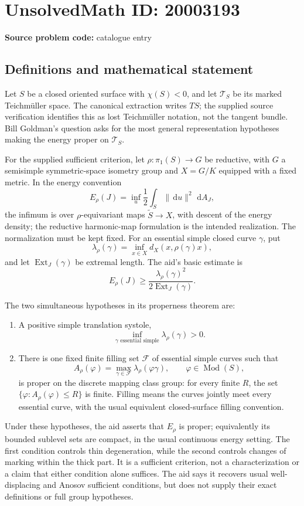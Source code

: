\documentclass[11pt]{article}
\newcommand{\dd}{\,\mathrm{d}}
\begin{document}
\section*{UnsolvedMath ID: 20003193}
\textbf{Source problem code:} catalogue entry
\subsection{Definitions and mathematical statement}
Let \(S\) be a closed oriented surface with \(\chi(S)<0\), and let \(\mathcal T_S\) be its marked Teichm\"uller space. The canonical extraction writes \(TS\); the supplied source verification identifies this as lost Teichm\"uller notation, not the tangent bundle. Bill Goldman's question asks for the most general representation hypotheses making the energy proper on \(\mathcal T_S\).

For the supplied sufficient criterion, let \(\rho:\pi_1(S)\to G\) be reductive, with \(G\) a semisimple symmetric-space isometry group and \(X=G/K\) equipped with a fixed metric. In the energy convention
\[
 E_\rho(J)=\inf_u\frac12\int_S\|\dd u\|^2\,\dd A_J,
\]
the infimum is over \(\rho\)-equivariant maps \(\widetilde S\to X\), with descent of the energy density; the reductive harmonic-map formulation is the intended realization. The normalization must be kept fixed. For an essential simple closed curve \(\gamma\), put
\[
 \lambda_\rho(\gamma)=\inf_{x\in X}d_X(x,\rho(\gamma)x),
\]
and let \(\operatorname{Ext}_J(\gamma)\) be extremal length. The aid's basic estimate is
\[
 E_\rho(J)\geq\frac{\lambda_\rho(\gamma)^2}{2\operatorname{Ext}_J(\gamma)}.
\]

The two simultaneous hypotheses in its properness theorem are:
\begin{enumerate}
\item A positive simple translation systole,
\[
 \inf_{\gamma\text{ essential simple}}\lambda_\rho(\gamma)>0.
\]
\item There is one fixed finite filling set \(\mathcal F\) of essential simple curves such that
\[
 A_\rho(\varphi)=\max_{\gamma\in\mathcal F}\lambda_\rho(\varphi\gamma),
 \qquad\varphi\in\operatorname{Mod}(S),
\]
is proper on the discrete mapping class group: for every finite \(R\), the set \(\{\varphi:A_\rho(\varphi)\leq R\}\) is finite. Filling means the curves jointly meet every essential curve, with the usual equivalent closed-surface filling convention.
\end{enumerate}
Under these hypotheses, the aid asserts that \(E_\rho\) is proper; equivalently its bounded sublevel sets are compact, in the usual continuous energy setting. The first condition controls thin degeneration, while the second controls changes of marking within the thick part. It is a sufficient criterion, not a characterization or a claim that either condition alone suffices. The aid says it recovers usual well-displacing and Anosov sufficient conditions, but does not supply their exact definitions or full group hypotheses.
\end{document}
